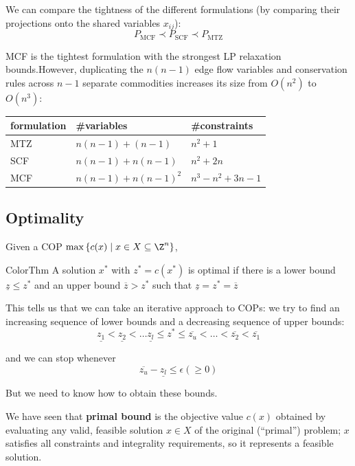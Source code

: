 \documentclass[a4paper, 11pt]{report}
\begin{document}
We can compare the tightness of the different formulations (by comparing their projections onto the shared variables $x_{ij}$):
$$ P_{\text{MCF}} \prec P_{\text{SCF}} \prec P_{\text{MTZ}} $$

MCF is the tightest formulation with the strongest LP relaxation bounds.However, duplicating the $n(n-1)$ edge flow variables and conservation rules across $n-1$ separate commodities increases its size from $O(n^2)$ to $O(n^3)$:

\begin{center}
\begin{tabular}{lll}
    \hline
    formulation & \#variables & \#constraints \\
    \hline
    MTZ & $n(n-1) + (n-1)$ & $n^2 + 1$ \\
    SCF & $n(n-1) + n(n-1)$ & $n^2 + 2n$ \\
    MCF & $n(n-1) + n(n-1)^2$ & $n^3 - n^2 + 3n - 1$ \\
    \hline
\end{tabular}
\end{center}

\subsection{Optimality}

Given a COP $\max\set{c(x)}[x \in X \subseteq \Z^{n}]$,

\begin{cframe}{ColorThm}{}
    A solution $x^{*}$ with $z^{*} = c(x^{*})$ is optimal if there is a lower bound $\underline{z}\leq z^{*}$ and an upper bound $\overline{z} > z^{*}$ such that $\underline{z} = z^{*} = \overline{z}$
\end{cframe}

This tells us that we can take an iterative approach to COPs: we try to find an increasing sequence of lower bounds and a decreasing sequence of upper bounds:
$$ \underline{z_1} < \underline{z_2} < \dots \underline{z_l} \leq  z^{*} \leq \overline{z_{u}}  < \dots < \overline{z_2} < \overline{z_1}$$

and we can stop whenever
$$\overline{z_{u}} - \underline{z_{l}} \leq \epsilon (\geq 0)$$

But we need to know how to obtain these bounds.

We have seen that \textbf{primal bound} is the objective value $c(x)$ obtained by evaluating any valid, feasible solution $x \in X$ of the original (``primal'') problem; $x$ satisfies all constraints and integrality requirements, so it represents a feasible solution.
\end{document}
